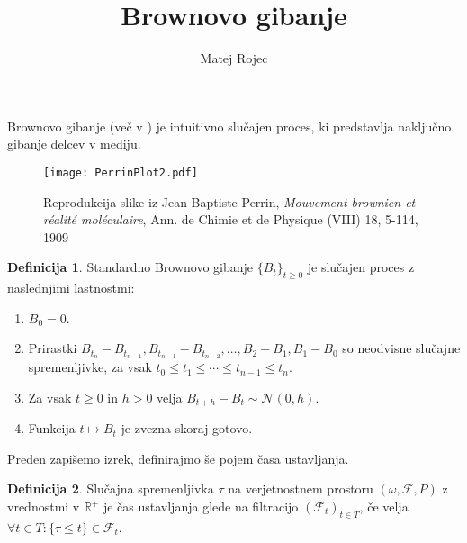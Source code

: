 \documentclass[11pt]{article}
\title{Brownovo gibanje}
\author{Matej Rojec}
\date{}
\newcommand{\f}{\mathcal{F}}
\begin{document}
\maketitle

\theoremstyle{definition}
\newtheorem{definicija}{Definicija}

\theoremstyle{plain}
\newtheorem{izrek}{Izrek}

Brownovo gibanje (več v \cite{karatzas1991browian}) je intuitivno slučajen proces, %
ki predstavlja naključno gibanje delcev v mediju.


    
\begin{figure}[ht!]
    \centering
    \texttt{[image: PerrinPlot2.pdf]}
    \caption{Reprodukcija slike iz Jean Baptiste Perrin, \emph{Mouvement brownien et réalité moléculaire}, Ann. de Chimie et de Physique (VIII) 18, 5-114, 1909}  


  \end{figure}



    \begin{definicija}
        Standardno Brownovo gibanje $\{B_t\}_{t \geq 0}$ je slučajen proces z naslednjimi lastnostmi: 
       \begin{enumerate}
       \item  $B_0 = 0$.
        \item Prirastki $B_{t_n} - B_{t_{n-1}}, B_{t_{n-1}} - B_{t_{n-2}}, \ldots, B_2 - B_1, B_1 - B_0$ so neodvisne slučajne spremenljivke, za vsak $t_0 \leq t_1 \leq \cdots \leq t_{n-1} \leq t_n$.
        \item Za vsak $t \geq 0$ in $h > 0$ velja $B_{t+h} - B_t \sim \mathcal{N}(0, h)$.
        \item Funkcija $t \mapsto B_t$ je zvezna skoraj gotovo.

       \end{enumerate}
       
    \end{definicija}
    
   
    
    Preden zapišemo izrek, definirajmo še pojem časa ustavljanja.
    
    \begin{definicija}
        Slučajna spremenljivka $\tau$ na verjetnostnem prostoru $ (\omega,\f,P)$ z vrednostmi v $ \mathbb{R}^+$
    je čas ustavljanja glede na filtracijo $ (\f_t)_{t \in T}$, če velja $ \forall t \in T : \{\tau \leq t\} \in \f_t$.
    \end{definicija}
    
\end{document}
